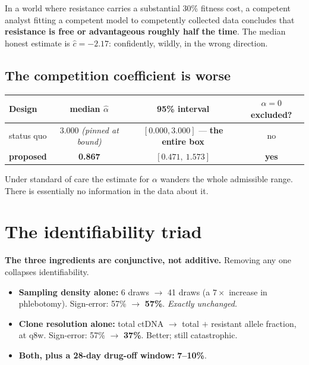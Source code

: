 \documentclass[11pt,a4paper]{article}
\newcommand{\chat}{\hat{c}}
\begin{document}
\begin{tcolorbox}[keybox]
In a world where resistance carries a substantial 30\% fitness cost, a competent
analyst fitting a competent model to competently collected data concludes that
\textbf{resistance is free or advantageous roughly half the time}. The median
honest estimate is $\chat = -2.17$: confidently, wildly, in the wrong direction.
\end{tcolorbox}

\subsection{The competition coefficient is worse}

\begin{center}
\small
\begin{tabular}{lccc}
\toprule
\textbf{Design} & \textbf{median $\hat{\alpha}$} & \textbf{95\% interval} & \textbf{$\alpha=0$ excluded?}\\
\midrule
status quo & 3.000 \emph{(pinned at bound)} & $[0.000, 3.000]$ --- \textbf{the entire box} & no\\
\textbf{proposed} & \textbf{0.867} & $\mathbf{[0.471,\ 1.573]}$ & \textbf{yes}\\
\bottomrule
\end{tabular}
\end{center}

Under standard of care the estimate for $\alpha$ wanders the whole admissible
range. There is essentially no information in the data about it.

\section{The identifiability triad}

\textbf{The three ingredients are conjunctive, not additive.} Removing any one
collapses identifiability.

\begin{itemize}[leftmargin=1.4em,itemsep=0.3em]
\item \textbf{Sampling density alone:} 6 draws $\to$ 41 draws (a $7\times$ increase
in phlebotomy). Sign-error: 57\% $\to$ \textbf{57\%}. \emph{Exactly unchanged.}
\item \textbf{Clone resolution alone:} total ctDNA $\to$ total $+$ resistant allele
fraction, at q8w. Sign-error: 57\% $\to$ \textbf{37\%}. Better; still catastrophic.
\item \textbf{Both, plus a 28-day drug-off window:} \textbf{7--10\%}.
\end{itemize}
\end{document}
